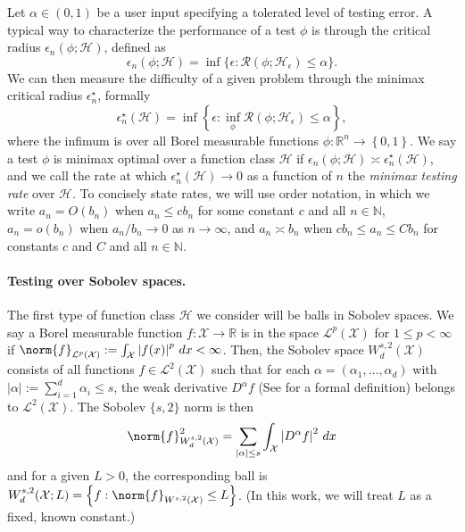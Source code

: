 \documentclass{article}
\newcommand{\Reals}{\mathbb{R}}
\newcommand{\abs}[1]{\left \lvert #1 \right \rvert}
\newcommand{\set}[1]{\left\{#1\right\}}
\newcommand{\1}{\mathbf{1}}
\newcommand{\Xset}{\mathcal{X}}
\theoremstyle{alden}
\theoremstyle{aldenthm}
\theoremstyle{definition}
\theoremstyle{remark}
\begin{document}
Let $\alpha \in (0,1)$ be a user input specifying a tolerated level of testing error. A typical way to characterize the performance of a test $\phi$ is through the critical radius $\epsilon_n(\phi; \mathcal{H})$, defined as
\begin{equation*}
\epsilon_n(\phi; \mathcal{H}) = \inf\{\epsilon: \mathcal{R}(\phi; \mathcal{H}_{\epsilon}) \leq \alpha\}.
\end{equation*}
We can then measure the difficulty of a given problem through the minimax critical radius $\epsilon_n^{\star}$, formally 
\begin{equation*}
\epsilon_n^{\star}(\mathcal{H}) = \inf \set{\epsilon:\inf_{\phi} \mathcal{R}(\phi; \mathcal{H}_{\epsilon} ) \leq \alpha},
\end{equation*}
where the infimum is over all Borel measurable functions $\phi: \Reals^n \to \set{0,1}$. We say a test $\phi$ is minimax optimal over a function class $\mathcal{H}$ if $\epsilon_n(\phi; \mathcal{H}) \asymp \epsilon_n^{\star}(\mathcal{H})$, and we call the rate at which $\epsilon_n^{\star}(\mathcal{H}) \to 0$ as a function of $n$ the \emph{minimax testing rate} over $\mathcal{H}$. To concisely state rates, we will use order notation, in which we write $a_n = O(b_n)$ when $a_n \leq c b_n$ for some constant $c$ and all $n \in \mathbb{N}$, $a_n = o(b_n)$ when $a_n/b_n \to 0$ as $n \to \infty$, and $a_n \asymp b_n$ when $c b_n \leq a_n \leq C b_n$ for constants $c$ and $C$ and all $n \in \mathbb{N}$.

\paragraph{Testing over Sobolev spaces.}
The first type of function class $\mathcal{H}$ we consider will be balls in Sobolev spaces. We say a Borel measurable function $f: \mathcal{X} \to \Reals$ is in the space $\mathcal{L}^p(\mathcal{X})$ for $1 \leq p < \infty$ if 
$\norm{f}_{\mathcal{L}^p(\mathcal{X})} := \int_{\mathcal{X}} \abs{f(x)}^p \,dx < \infty$. Then, the Sobolev space $W_d^{s,2}(\mathcal{X})$ consists of all functions $f \in \mathcal{L}^2(\mathcal{X})$ such that for each $\alpha = (\alpha_1,\ldots,\alpha_d)$ with $\abs{\alpha} := \sum_{i = 1}^{d} \alpha_i \leq s$, the weak derivative $D^{\alpha}f$ (See \citet{evans10} for a formal definition) belongs to $\mathcal{L}^2(\mathcal{X})$. The Sobolev $\{s,2\}$ norm is then 
\begin{equation*}
\norm{f}_{W_d^{s,2}(\mathcal{X})}^2 = \sum_{\abs{\alpha} \leq s} \int_{\mathcal{X}} \abs{D^{\alpha}f}^2 \,dx
\end{equation*}
and for a given $L > 0$, the corresponding ball is $W_d^{s,2}(\Xset; L) = \set{f: \norm{f}_{W^{s,2}(\Xset)} \leq L}$. (In this work, we will treat $L$ as a fixed, known constant.)
\end{document}
